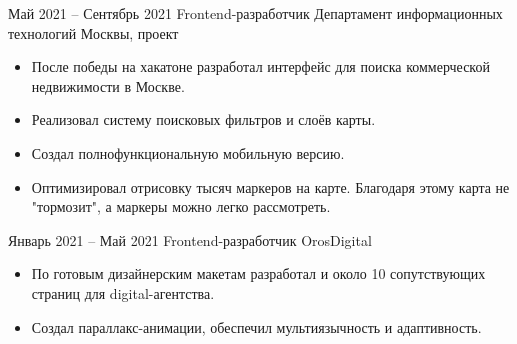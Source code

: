 \experience
{Май 2021 -- Сентябрь 2021}
{Frontend-разработчик}
{Департамент информационных технологий Москвы, проект}
{\begin{itemize}
    \item После победы на хакатоне разработал интерфейс  для поиска коммерческой недвижимости в Москве.
    \item Реализовал систему поисковых фильтров и слоёв карты.
    \item Создал полнофункциональную мобильную версию.
    \item Оптимизировал отрисовку тысяч маркеров на карте. Благодаря этому карта не "тормозит", а маркеры можно легко рассмотреть.
\end{itemize}}

\experience
{Январь 2021 -- Май 2021}
{Frontend-разработчик}
{OrosDigital}
{\begin{itemize}
    \item По готовым дизайнерским макетам разработал  и около 10 сопутствующих страниц для digital-агентства.
    \item Создал параллакс-анимации, обеспечил мультиязычность и адаптивность.
\end{itemize}}